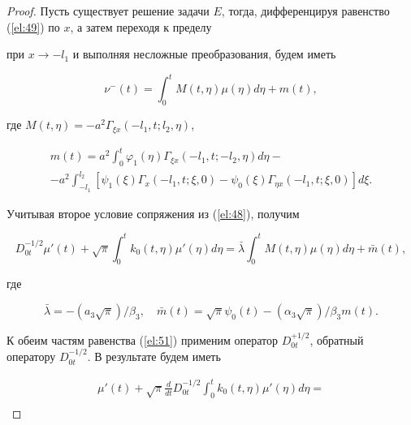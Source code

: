 \smallskip



\begin{proof}

Пусть существует решение задачи $E$, тогда, дифференцируя равенство (\ref{el:49}) по $x$, а затем переходя к пределу 

при $x\to{-l_1}$ и выполняя несложные преобразования, будем иметь

\begin{equation} \label{el:50}

\nu^-(t)=\int_0^tM(t,\eta)\mu(\eta)d\eta+m(t),

\end{equation}

где $M(t,\eta)=-a^2\Gamma_{\xi x}(-l_1,t;l_2,\eta)$, 

\begin{multline*}

m(t)=a^2\int_0^t\varphi_1(\eta)\Gamma_{\xi x}(-l_1,t;-l_2,\eta)d\eta-\\

-a^2\int_{-l_1}^{l_2}[\psi_1(\xi)\Gamma_x(-l_1,t;\xi,0)-\psi_0(\xi)\Gamma_{\eta x}(-l_1,t;\xi,0)]d\xi.

\end{multline*}



Учитывая второе условие сопряжения из (\ref{el:48}), получим 

\begin{equation} \label{el:51}

D_{0t}^{-1/2}\mu'(t)+\sqrt{\pi}\int_0^tk_0(t,\eta)\mu'(\eta)d\eta=\bar{\lambda}\int_0^tM(t,\eta)\mu(\eta)d\eta+\bar{m}(t),

\end{equation}

где

$$

\bar{\lambda}=-(a_3\sqrt{\pi})/\beta_3, \quad \bar{m}(t)=\sqrt{\pi}\psi_0(t)-(\alpha_3\sqrt{\pi})/\beta_3m(t).

$$

К обеим частям равенства (\ref{el:51}) применим оператор $D_{0t}^{+1/2}$, обратный оператору $D_{0t}^{-1/2}$. В результате будем иметь

\begin{multline*}

\mu'(t)+\sqrt{\pi}\frac{d}{dt}D_{0t}^{-1/2}\int_0^tk_0(t,\eta)\mu'(\eta)d\eta=

\\


\end{multline*}
\end{proof}
